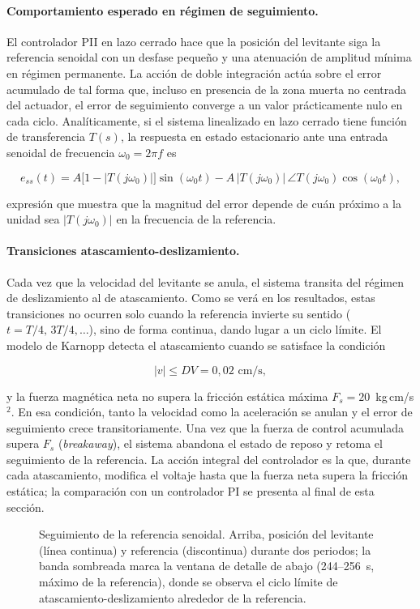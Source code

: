 \paragraph{Comportamiento esperado en régimen de seguimiento.}
El controlador PII en lazo cerrado hace que la posición del levitante siga la referencia senoidal
con un desfase pequeño y una atenuación de amplitud mínima en régimen permanente.
La acción de doble integración actúa sobre el error acumulado de tal forma que, incluso en
presencia de la zona muerta no centrada del actuador, el error de seguimiento converge a un
valor prácticamente nulo en cada ciclo.
Analíticamente, si el sistema linealizado en lazo cerrado tiene función de transferencia
$T(s)$, la respuesta en estado estacionario ante una entrada senoidal de frecuencia $\omega_0 = 2\pi f$ es

\[
  e_{ss}(t) = A\bigl[1 - |T(j\omega_0)|\bigr]\sin(\omega_0 t)
              - A\,|T(j\omega_0)|\,\angle T(j\omega_0)\cos(\omega_0 t),
\]

expresión que muestra que la magnitud del error depende de cuán próximo a la unidad sea
$|T(j\omega_0)|$ en la frecuencia de la referencia.

\paragraph{Transiciones atascamiento-deslizamiento.}
Cada vez que la velocidad del levitante se anula, el sistema transita del régimen de deslizamiento al de atascamiento. Como se verá en los resultados, estas transiciones no ocurren solo cuando la referencia invierte su sentido ($t = T/4,\,3T/4,\ldots$), sino de forma continua, dando lugar a un ciclo límite.
El modelo de Karnopp detecta el atascamiento cuando se satisface la condición

\[
  |v| \leq DV = 0{,}02 \text{ cm/s},
\]

y la fuerza magnética neta no supera la fricción estática máxima $F_s = 20$~kg\,cm/s$^2$.
En esa condición, tanto la velocidad como la aceleración se anulan y el error de seguimiento
crece transitoriamente.
Una vez que la fuerza de control acumulada supera $F_s$ (\emph{breakaway}), el sistema
abandona el estado de reposo y retoma el seguimiento de la referencia.
La acción integral del controlador es la que, durante cada atascamiento, modifica el voltaje hasta que la fuerza neta supera la fricción estática; la comparación con un controlador PI se presenta al final de esta sección.

\begin{figure}[ht]
    \centering
    
    \caption[Seguimiento senoidal: posición]{Seguimiento de la referencia senoidal. Arriba, posición del levitante (línea continua) y referencia (discontinua) durante dos periodos; la banda sombreada marca la ventana de detalle de abajo (244--256~s, máximo de la referencia), donde se observa el ciclo límite de atascamiento-deslizamiento alrededor de la referencia.}
    \label{fig:sen_pos}
\end{figure}

